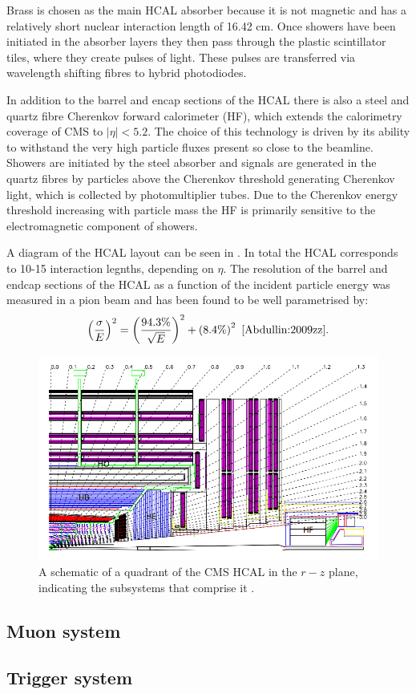 Brass is chosen as the main \ac{HCAL} absorber because it is not magnetic and has a relatively short nuclear interaction length of 16.42 cm. Once showers have been initiated in the absorber layers they then pass through the plastic scintillator tiles, where they create pulses of light. These pulses are transferred via wavelength shifting fibres to hybrid photodiodes.

In addition to the barrel and encap sections of the \ac{HCAL} there is also a steel and quartz fibre Cherenkov forward calorimeter (\ac{HF}), which extends the calorimetry coverage of CMS to $|\eta|<5.2$. The choice of this technology is driven by its ability to withstand the very high particle fluxes present so close to the beamline. Showers are initiated by the steel absorber and signals are generated in the quartz fibres by particles above the Cherenkov threshold generating Cherenkov light, which is collected by photomultiplier tubes. Due to the Cherenkov energy threshold increasing with particle mass the \ac{HF} is primarily sensitive to the electromagnetic component of showers.

A diagram of the \ac{HCAL} layout can be seen in . In total the \ac{HCAL} corresponds to 10-15 interaction legnths, depending on $\eta$. The resolution of the barrel and endcap sections of the \ac{HCAL} as a function of the incident particle energy was measured in a pion beam and has been found to be well parametrised by:
\begin{equation} 
  \label{eq:hcalres}
  \left(\frac{\sigma}{E}\right)^{2}=\left(\frac{94.3\%}{\sqrt{E}}\right)^{2}+\left(8.4\%\right)^{2}~\cite{Abdullin:2009zz}.
\end{equation}

\begin{figure}
  \includegraphics[width=1.2\largefigwidth]{plots/detector/hcal_layout1.png}
  \caption{A schematic of a quadrant of the CMS \ac{HCAL} in the $r-z$ plane, indicating the subsystems that comprise it \cite{Chatrchyan:2008aa}.}
  \label{fig:hcalschematic}
\end{figure}

\subsection{Muon system}

\subsection{Trigger system}
\label{sec:triggers}

